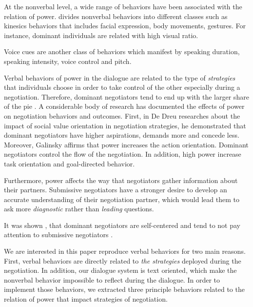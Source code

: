 \documentclass{llncs}
\begin{document}
	At the nonverbal level, a wide range of behaviors have been associated with the relation of power. \cite{burgoonnonverbal} divides nonverbal behaviors into  different classes such as kinesics behaviors that includes facial expression, body movements, gestures. For instance, dominant individuals are related with high visual ratio.
	
	Voice cues are another class of behaviors which manifest by speaking duration, speaking intensity, voice control and pitch.
	
	
	Verbal behaviors of power in the dialogue are related to the type of \textit{strategies} that individuals choose in order to take control of the other especially during a negotiation. Therefore, dominant negotiators tend to end up with the larger share of the pie \cite{giebels2000interdependence}. 
	 A considerable body of research has documented the effects of power on negotiation behaviors and outcomes. First, in De Dreu researches about the impact of social value orientation in negotiation strategies, he demonstrated that \cite{de1995impact} dominant negotiators have higher aspirations, demands more and concede less. 
	Moreover, Galinsky \cite{galinsky2003power} affirms that power increases the action orientation. Dominant negotiators control the flow of the negotiation. In addition, high power increase task orientation and goal-directed behavior. 
	
	Furthermore, power affects the way that negotiators gather information about their partners. Submissive negotiators have a stronger desire to develop an accurate understanding of their negotiation partner, which would lead them to ask more \emph{diagnostic} rather than \emph{leading} questions.
	
	It was shown \cite{fiske1993controlling},\cite{de1995impact} that dominant negotiators are self-centered and tend to not pay attention to submissive negotiators .
	\par We are interested in this paper reproduce  verbal behaviors for two main reasons. First, verbal behaviors are directly related to \emph{the strategies} deployed during the negotiation. In addition, our dialogue system is text oriented, which make the nonverbal behavior impossible to reflect during the dialogue. 
	In order to implement those behaviors, we extracted three principle behaviors related to the relation of power that impact strategies of negotiation.
\end{document}
